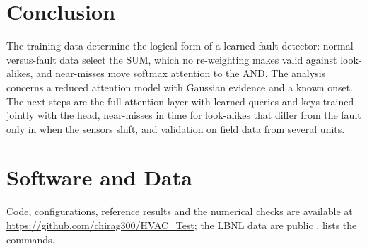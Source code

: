 \documentclass{article}
\theoremstyle{plain}
\theoremstyle{definition}
\theoremstyle{remark}
\begin{document}
\section{Conclusion}\label{sec:conc}

The training data determine the logical form of a learned fault detector: normal-versus-fault data select the SUM, which no re-weighting makes valid against look-alikes, and near-misses move softmax attention to the AND. The analysis concerns a reduced attention model with Gaussian evidence and a known onset. The next steps are the full attention layer with learned queries and keys trained jointly with the head, near-misses in time for look-alikes that differ from the fault only in when the sensors shift, and validation on field data from several units.

\section*{Software and Data}
Code, configurations, reference results and the numerical checks are available at \url{https://github.com/chirag300/HVAC_Test}; the LBNL data are public \citep{granderson2023}.  lists the commands.




\newpage
\appendix
\onecolumn

\end{document}
